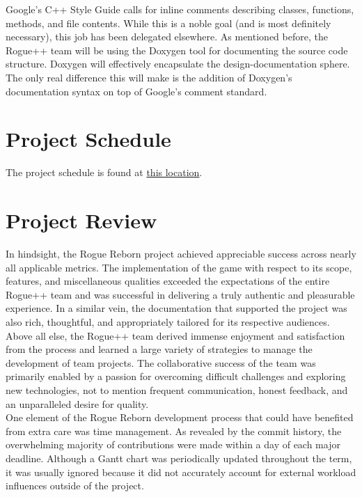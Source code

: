 \documentclass{article}
\newcommand{\rev}[1]{\textcolor{RevisionColour}{#1}}
\begin{document}
Google's C++ Style Guide calls for inline comments describing classes, functions, methods, and file contents.  While this is a noble goal (and is most definitely necessary), this job has been delegated elsewhere.  As mentioned before, the Rogue++ team will be using the Doxygen tool for documenting the source code structure.  Doxygen will effectively encapsulate the design-documentation sphere. The only real difference this will make is the addition of Doxygen's documentation syntax on top of Google's comment standard.

\section{Project Schedule}
\label{schedule_label}

\indent
The project schedule is found at \href{run:../../ProjectSchedule/Rogue.gan}{this location}.

\section{Project Review}

\rev{In hindsight, the Rogue Reborn project achieved appreciable success across nearly all applicable metrics.  The implementation of the game with respect to its scope, features, and miscellaneous qualities exceeded the expectations of the entire Rogue++ team and was successful in delivering a truly authentic and pleasurable experience.  In a similar vein, the documentation that supported the project was also rich, thoughtful, and appropriately tailored for its respective audiences.  Above all else, the Rogue++ team derived immense enjoyment and satisfaction from the process and learned a large variety of strategies to manage the development of team projects.  The collaborative success of the team was primarily enabled by a passion for overcoming difficult challenges and exploring new technologies, not to mention frequent communication, honest feedback, and an unparalleled desire for quality.} \\

\rev{One element of the Rogue Reborn development process that could have benefited from extra care was time management.  As revealed by the commit history, the overwhelming majority of contributions were made within a day of each major deadline.  Although a Gantt chart was periodically updated throughout the term, it was usually ignored because it did not accurately account for external workload influences outside of the project.} \\
\end{document}
